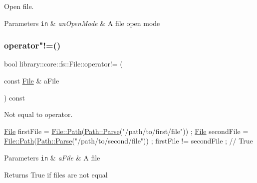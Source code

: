 Open file. 


\begin{DoxyParams}[1]{Parameters}
\mbox{\tt in}  & {\em an\+Open\+Mode} & A file open mode \\
\hline
\end{DoxyParams}
\mbox{\label{classlibrary_1_1core_1_1fs_1_1_file_a0354b6dd59250c07cd5a8b679dc36d95}} 
\subsubsection{\texorpdfstring{operator"!=()}{operator!=()}}
{\footnotesize\ttfamily bool library\+::core\+::fs\+::\+File\+::operator!= (\begin{DoxyParamCaption}\item[{const \hyperlink{classlibrary_1_1core_1_1fs_1_1_file}{File} \&}]{a\+File }\end{DoxyParamCaption}) const}



Not equal to operator. 


\begin{DoxyCode}
\hyperlink{classlibrary_1_1core_1_1fs_1_1_file_a6f3f0d79545ac9984c6f49432f0c6c39}{File} firstFile = \hyperlink{classlibrary_1_1core_1_1fs_1_1_file_a72d6cdf8bb7e299889c6149e2b8a6cc7}{File::Path}(\hyperlink{classlibrary_1_1core_1_1fs_1_1_path_a6ba644b6609507e724c217bf2020f5ae}{Path::Parse}(\textcolor{stringliteral}{"/path/to/first/file"})) ;
\hyperlink{classlibrary_1_1core_1_1fs_1_1_file_a6f3f0d79545ac9984c6f49432f0c6c39}{File} secondFile = \hyperlink{classlibrary_1_1core_1_1fs_1_1_file_a72d6cdf8bb7e299889c6149e2b8a6cc7}{File::Path}(\hyperlink{classlibrary_1_1core_1_1fs_1_1_path_a6ba644b6609507e724c217bf2020f5ae}{Path::Parse}(\textcolor{stringliteral}{"/path/to/second/file"})) ;
firstFile != secondFile ; \textcolor{comment}{// True}
\end{DoxyCode}



\begin{DoxyParams}[1]{Parameters}
\mbox{\tt in}  & {\em a\+File} & A file \\
\hline
\end{DoxyParams}
\begin{DoxyReturn}{Returns}
True if files are not equal 
\end{DoxyReturn}
\mbox{\label{classlibrary_1_1core_1_1fs_1_1_file_ad41b20bf5ad58a760115c43d8c84e130}} 
